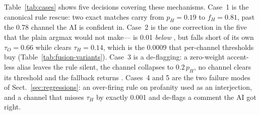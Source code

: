 Table~\ref{tab:cases} shows five decisions covering these mechanisms. Case~1 is the
canonical rule rescue: two exact matches carry \hate{} from $p_H{=}0.19$ to
$f_H{=}0.81$, past the 0.78 \clean{} channel the AI is confident in. Case~2 is the one
correction in the five that the plain argmax would not make---\hate{} is 0.01 \emph{below}
\off{}, but \off{} falls short of its own $\tau_O{=}0.66$ while \hate{} clears
$\tau_H{=}0.14$, which is the 0.0009 that per-channel thresholds buy
(Table~\ref{tab:fusion-variants}). Case~3 is a de-flagging: a zero-weight accent-less alias
leaves the rule silent, the \hate{} channel collapses to $0.2\,p_H$, no channel clears
its threshold and the fallback returns \clean{}. Cases~4 and 5 are the two failure
modes of Sect.~\ref{sec:regressions}: an over-firing rule on profanity used as an
interjection, and a \hate{} channel that misses $\tau_H$ by exactly 0.001 and de-flags
a comment the AI got right.


